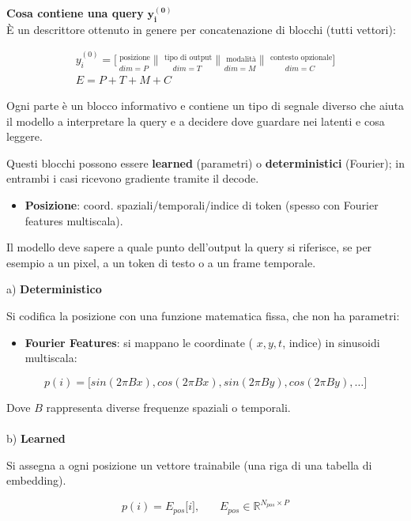 \documentclass[
  11pt,
]{article}
\begin{document}
\textbf{Cosa contiene una query}
\(\mathbf{y}_{\mathbf{i}}^{\mathbf{(0)}}\)\\
È un descrittore ottenuto in genere per concatenazione di blocchi (tutti
vettori):

\[\begin{matrix}
y_{i}^{(0)} = \lbrack\underset{dim = P}{\overset{\text{ posizione}}{}}\|\underset{dim = T}{\overset{\text{ tipo di output}}{}}\|\underset{dim = M}{\overset{\text{ modalità}}{}}\|\underset{dim = C}{\overset{\text{ contesto opzionale}}{}}\rbrack \\
E = P + T + M + C
\end{matrix}\]

Ogni parte è un blocco informativo e contiene un tipo di segnale diverso
che aiuta il modello a interpretare la query e a decidere dove guardare
nei latenti e cosa leggere.

Questi blocchi possono essere \textbf{learned} (parametri) o
\textbf{deterministici} (Fourier); in entrambi i casi ricevono gradiente
tramite il decode.

\begin{itemize}
\item
  \textbf{Posizione}: coord. spaziali/temporali/indice di token (spesso
  con Fourier features multiscala).
\end{itemize}


Il modello deve sapere a quale punto dell'output la query si riferisce,
se per esempio a un pixel, a un token di testo o a un frame temporale.

a) \textbf{Deterministico}

Si codifica la posizione con una funzione matematica fissa, che non ha
parametri:


\begin{itemize}
\item
  \textbf{Fourier Features}: si mappano le coordinate ( \(x,y,t\),
  indice) in sinusoidi multiscala:
\end{itemize}

\[p(i) = \lbrack sin(2\pi Bx),cos(2\pi Bx),sin(2\pi By),cos(2\pi By),\ldots\rbrack\]

Dove \(B\) rappresenta diverse frequenze spaziali o temporali.\\
\\
b) \textbf{Learned}

Si assegna a ogni posizione un vettore trainabile (una riga di una
tabella di embedding).

\[p(i) = E_{pos}\lbrack i\rbrack,\ \ \ \ \ \ \ \ E_{pos} \in \mathbb{R}^{N_{pos} \times P}\]
\end{document}
